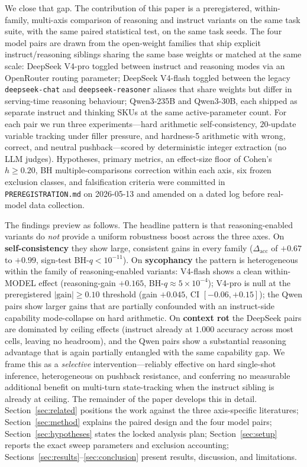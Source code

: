 We close that gap. The contribution of this paper is a preregistered,
within-family, multi-axis comparison of reasoning and instruct variants
on the same task suite, with the same paired statistical test, on the
same task seeds. The four model pairs are drawn from the open-weight
families that ship explicit instruct/reasoning siblings sharing the
same base weights or matched at the same scale: DeepSeek V4-pro toggled
between instruct and reasoning modes via an OpenRouter routing parameter;
DeepSeek V4-flash toggled between the legacy \texttt{deepseek-chat} and
\texttt{deepseek-reasoner} aliases that share weights but differ in
serving-time reasoning behaviour; Qwen3-235B and Qwen3-30B, each shipped
as separate instruct and thinking SKUs at the same active-parameter
count. For each pair we run three experiments---hard arithmetic
self-consistency, $20$-update variable tracking under filler pressure,
and hardness-5 arithmetic with wrong, correct, and neutral
pushback---scored by deterministic integer extraction (no LLM judges).
Hypotheses, primary metrics, an effect-size floor of Cohen's $h \geq
0.20$, BH multiple-comparisons correction within each axis, six frozen
exclusion classes, and falsification criteria were committed in
\texttt{PREREGISTRATION.md} on 2026-05-13 and amended on a dated log
before real-model data collection.

The findings preview as follows. The headline pattern is that
reasoning-enabled variants do \emph{not} provide a uniform robustness
boost across the three axes. On \textbf{self-consistency} they show
large, consistent gains in every family ($\Delta_{\mathrm{acc}}$ of
$+0.67$ to $+0.99$, sign-test BH-$q < 10^{-11}$). On
\textbf{sycophancy} the pattern is heterogeneous within the family of
reasoning-enabled variants: V4-flash shows a clean within-MODEL effect
(reasoning-gain $+0.165$, BH-$q \approx 5{\times}10^{-4}$); V4-pro is
null at the preregistered $|\mathrm{gain}|\geq 0.10$ threshold (gain
$+0.045$, CI $[-0.06, +0.15]$); the Qwen pairs show larger gains that
are partially confounded with an instruct-side capability mode-collapse
on hard arithmetic. On \textbf{context rot} the DeepSeek pairs are
dominated by ceiling effects (instruct already at $1.000$ accuracy
across most cells, leaving no headroom), and the Qwen pairs show a
substantial reasoning advantage that is again partially entangled with
the same capability gap. We frame this as a \emph{selective}
intervention---reliably effective on hard single-shot inference,
heterogeneous on pushback resistance, and conferring no measurable
additional benefit on multi-turn state-tracking when the instruct
sibling is already at ceiling. The remainder of the paper
develops this in detail. Section~\ref{sec:related} positions the work
against the three axis-specific literatures; Section~\ref{sec:method}
explains the paired design and the four model pairs;
Section~\ref{sec:hypotheses} states the locked analysis plan;
Section~\ref{sec:setup} reports the exact sweep parameters and
exclusion accounting; Sections~\ref{sec:results}--\ref{sec:conclusion}
present results, discussion, and limitations.
